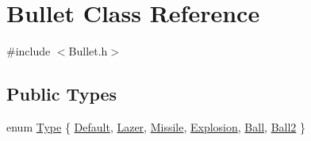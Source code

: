 \hypertarget{class_bullet}{}\section{Bullet Class Reference}
\label{class_bullet}


{\ttfamily \#include $<$Bullet.\+h$>$}

\subsection*{Public Types}
\begin{DoxyCompactItemize}
\item 
enum \hyperlink{class_bullet_adec43a70f99a7264217f71d4299796c3}{Type} \{ \newline
\hyperlink{class_bullet_adec43a70f99a7264217f71d4299796c3a4b20d6d9b77e501c9a41cef53b3f99b9}{Default}, 
\hyperlink{class_bullet_adec43a70f99a7264217f71d4299796c3aba34aa5cf5a49291cee710ffa9774f55}{Lazer}, 
\hyperlink{class_bullet_adec43a70f99a7264217f71d4299796c3a879dee304f28c3bc708ead5da2ee84e6}{Missile}, 
\hyperlink{class_bullet_adec43a70f99a7264217f71d4299796c3a28fbf11ec068c08b1eec3f886d0be8b5}{Explosion}, 
\newline
\hyperlink{class_bullet_adec43a70f99a7264217f71d4299796c3a30345037f1b00902f2667bb0a2638183}{Ball}, 
\hyperlink{class_bullet_adec43a70f99a7264217f71d4299796c3a4404b4dbb15a2d4584ccbe3495266060}{Ball2}
 \}
\end{DoxyCompactItemize}
